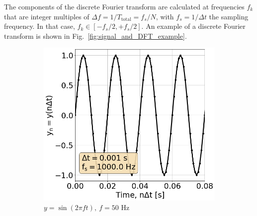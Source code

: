 
The components of the discrete Fourier transform are calculated at frequencies $f_k$ that are integer multiples of $\Delta f = 1/T_\mathrm{total} = f_s/N$, with $f_s = 1/\Delta t$ the sampling frequency. In that case, $f_k \in \left[-f_s/2, + f_s/2 \right]$. An example of a discrete Fourier transform is shown in Fig.~\ref{fig:signal_and_DFT_example}.


\begin{figure}[!ht]
    \centering
    \begin{subfigure}[t]{0.45\textwidth}
        \centering
        \includegraphics[width=1\textwidth]{./images/app_B/simple_signal_1freq_example.png}
        \caption{$y=\sin(2 \pi f t),\ f=50$ Hz}
        \label{fig:signal_and_DFT_example_a}
    \end{subfigure}
    \hfill
    \begin{subfigure}[t]{0.45\textwidth}
        \centering

\end{subfigure}
\end{figure}
